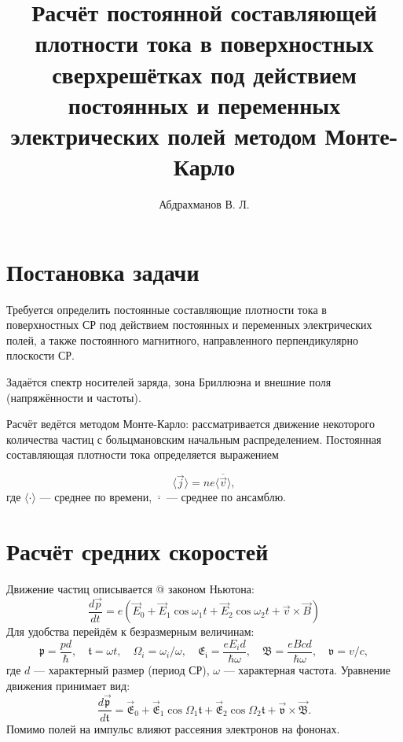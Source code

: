 \documentclass[a4paper]{article}
\title{Расчёт постоянной составляющей плотности тока в поверхностных сверхрешётках под действием постоянных и переменных электрических полей методом Монте-Карло}
\author{Абдрахманов В. Л.}
\makeatletter
\newcommand*{\rom}[1]{\expandafter\@slowromancap\romannumeral #1@}
\makeatother
\begin{document}
    \maketitle
    \section{Постановка задачи}
    Требуется определить постоянные составляющие плотности тока в поверхностных СР под действием постоянных и переменных электрических полей, а также постоянного магнитного, направленного перпендикулярно плоскости СР.

    Задаётся спектр носителей заряда, зона Бриллюэна и внешние поля (напряжённости и частоты).

    Расчёт ведётся методом Монте-Карло: рассматривается движение некоторого количества частиц с больцмановским начальным распределением. Постоянная составляющая плотности тока определяется выражением

    \begin{equation}
        \langle\vec{j}\rangle = ne\langle\overline{\vec{v}}\rangle,
    \end{equation}
    где $\langle \cdot \rangle$ --- среднее по времени, $\overline{\cdot}$ --- среднее по ансамблю.

    \section{Расчёт средних скоростей}
    Движение частиц описывается \rom{2} законом Ньютона:
    \begin{equation}
        \frac{d\vec{p}}{dt} = e(\vec{E}_0 + \vec{E}_1\cos\omega_1t + \vec{E}_2\cos\omega_2t + \vec{v}\times\vec{B})
    \end{equation}
    Для удобства перейдём к безразмерным величинам:
    \begin{equation}
        \mathfrak{p} = \frac{pd}{\hbar},\quad
        \mathfrak{t} = \omega t,\quad
        \Omega_i = \omega_i / \omega,\quad
        \mathfrak{E_i} = \frac{eE_id}{\hbar\omega},\quad
        \mathfrak{B} = \frac{eBcd}{\hbar\omega},\quad
        \mathfrak{v} = v/c,
    \end{equation}
    где \( d \) --- характерный размер (период СР), \( \omega \) --- характерная частота. Уравнение движения принимает вид:
    \begin{equation}
        \frac{d\vec{\mathfrak{p}}}{d\mathfrak{t}} = \vec{\mathfrak{E}}_0 + \vec{\mathfrak{E}}_1\cos\Omega_1\mathfrak{t} + \vec{\mathfrak{E}}_2\cos\Omega_2\mathfrak{t} + \vec{\mathfrak{v}}\times\vec{\mathfrak{B}}.
    \end{equation}
    Помимо полей на импульс влияют рассеяния электронов на фононах.
\end{document}
